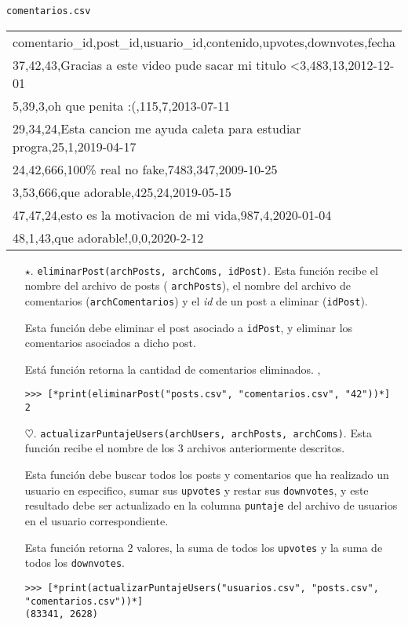 \begin{center}
    \texttt{comentarios.csv} \\
	\begin{tabular}{|l|}
		\hline
comentario\_id,post\_id,usuario\_id,contenido,upvotes,downvotes,fecha\\
37,42,43,Gracias a este video pude sacar mi titulo <3,483,13,2012-12-01\\
5,39,3,oh que penita :(,115,7,2013-07-11\\
29,34,24,Esta cancion me ayuda caleta para estudiar progra,25,1,2019-04-17\\
24,42,666,100\% real no fake,7483,347,2009-10-25\\
3,53,666,que adorable,425,24,2019-05-15\\
47,47,24,esto es la motivacion de mi vida,987,4,2020-01-04\\
48,1,43,que adorable!,0,0,2020-2-12\\
		\hline
	\end{tabular}

\end{center}

\begin{enumerate}

    \item[$\star$. ] \texttt{eliminarPost(archPosts, archComs, idPost)}. Esta función recibe el nombre del archivo de posts ( \texttt{archPosts}), el nombre del archivo de comentarios (\texttt{archComentarios}) y el \textit{id} de un post a eliminar (\texttt{idPost}).
    
    Esta función debe eliminar el post asociado a \texttt{idPost}, y eliminar los comentarios asociados a dicho post.

    Está función retorna la cantidad de comentarios eliminados.
,  
    \begin{lstlisting}[style=consola]
>>> [*print(eliminarPost("posts.csv", "comentarios.csv", "42"))*]
2
    \end{lstlisting}
    

    \item[$\heartsuit$.] \texttt{actualizarPuntajeUsers(archUsers, archPosts, archComs)}. Esta función recibe el nombre de los 3 archivos anteriormente descritos. 

    Esta función debe buscar todos los posts y comentarios que ha realizado un usuario en especifico, sumar sus \texttt{upvotes} y restar sus \texttt{downvotes}, y este resultado debe ser actualizado en la columna \texttt{puntaje} del archivo de usuarios en el usuario correspondiente.

    Esta función retorna 2 valores, la suma de todos los \texttt{upvotes} y la suma de todos los \texttt{downvotes}.

    \begin{lstlisting}[style=consola]
>>> [*print(actualizarPuntajeUsers("usuarios.csv", "posts.csv", "comentarios.csv"))*]
(83341, 2628)
    \end{lstlisting}

\end{enumerate}

